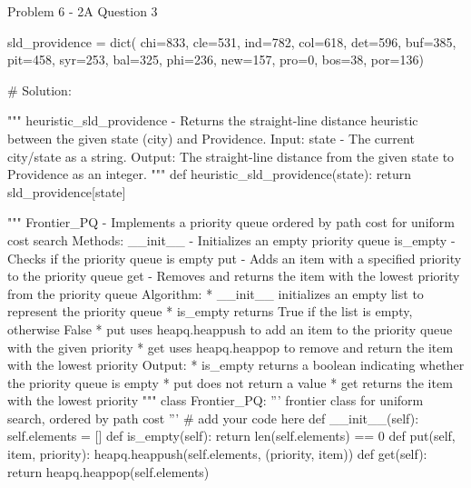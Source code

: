 \begin{problem}{Problem 6 - 2A Question 3}
\begin{highlight}[Solution]
\begin{code}[Python]
    sld_providence = dict(
        chi=833,
        cle=531,
        ind=782,
        col=618,
        det=596,
        buf=385,
        pit=458,
        syr=253,
        bal=325,
        phi=236,
        new=157,
        pro=0,
        bos=38,
        por=136)
    
    # Solution:
    
    """ heuristic_sld_providence - Returns the straight-line distance heuristic between the given state (city) and Providence.
        Input:
            state - The current city/state as a string.
        Output:
            The straight-line distance from the given state to Providence as an integer.
    """
    def heuristic_sld_providence(state):
        return sld_providence[state]
    
    """ Frontier_PQ - Implements a priority queue ordered by path cost for uniform cost search
        Methods:
            __init__ - Initializes an empty priority queue
            is_empty - Checks if the priority queue is empty
            put - Adds an item with a specified priority to the priority queue
            get - Removes and returns the item with the lowest priority from the priority queue
        Algorithm:
            * __init__ initializes an empty list to represent the priority queue
            * is_empty returns True if the list is empty, otherwise False
            * put uses heapq.heappush to add an item to the priority queue with the given priority
            * get uses heapq.heappop to remove and return the item with the lowest priority
        Output:
            * is_empty returns a boolean indicating whether the priority queue is empty
            * put does not return a value
            * get returns the item with the lowest priority
    """
    class Frontier_PQ:
        ''' frontier class for uniform search, ordered by path cost '''
        # add your code here
        def __init__(self):
            self.elements = []
        def is_empty(self):
            return len(self.elements) == 0
        def put(self, item, priority):
            heapq.heappush(self.elements, (priority, item))
        def get(self):
            return heapq.heappop(self.elements)
        

\end{code}
\end{highlight}
\end{problem}
